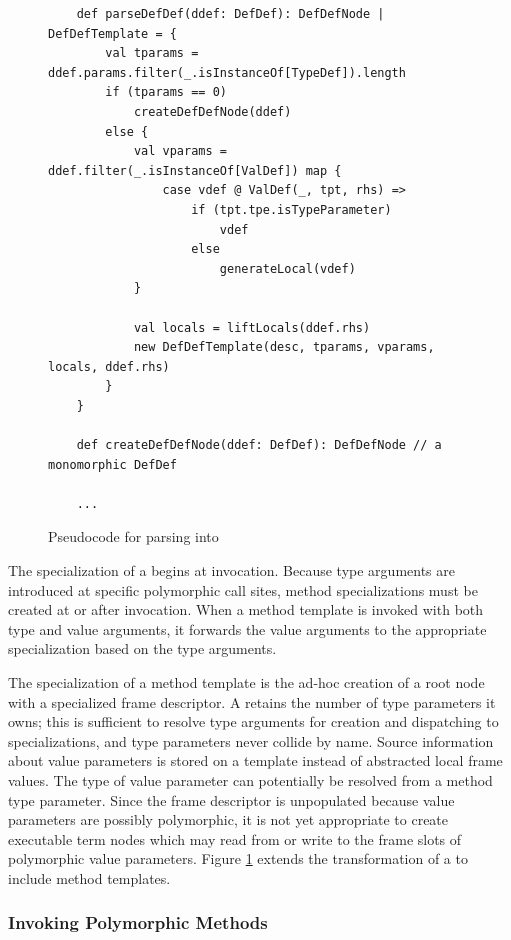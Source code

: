 \begin{figure}[!htb]
	\begin{verbatim}
	def parseDefDef(ddef: DefDef): DefDefNode | DefDefTemplate = {		
		val tparams = ddef.params.filter(_.isInstanceOf[TypeDef]).length
		if (tparams == 0)
			createDefDefNode(ddef)
		else {
			val vparams = ddef.filter(_.isInstanceOf[ValDef]) map {
				case vdef @ ValDef(_, tpt, rhs) => 
					if (tpt.tpe.isTypeParameter) 
						vdef
					else
						generateLocal(vdef)
			}
		
			val locals = liftLocals(ddef.rhs)
			new DefDefTemplate(desc, tparams, vparams, locals, ddef.rhs)
		}
	}

	def createDefDefNode(ddef: DefDef): DefDefNode // a monomorphic DefDef
		
	...
	\end{verbatim}
	\caption{Pseudocode for parsing  into }
	\label{impl:parse-poly-defdef}
\end{figure}

The specialization of a  begins at invocation.
Because type arguments are introduced at specific polymorphic call sites, method specializations must be created at or after invocation.
When a method template is invoked with both type and value arguments, it forwards the value arguments to the appropriate specialization based on the type arguments.

The specialization of a method template is the ad-hoc creation of a root node with a specialized frame descriptor.
A  retains the number of type parameters it owns; this is sufficient to resolve type arguments for creation and dispatching to specializations, and type parameters never collide by name.
Source information about value parameters is stored on a template instead of abstracted local frame values.
The type of value parameter can potentially be resolved from a method type parameter.
Since the frame descriptor is unpopulated because value parameters are possibly polymorphic, it is not yet appropriate to create executable term nodes which may read from or write to the frame slots of polymorphic value parameters.
Figure \ref{impl:parse-poly-defdef} extends the transformation of a  to include method templates.

\subsubsection*{Invoking Polymorphic Methods}

